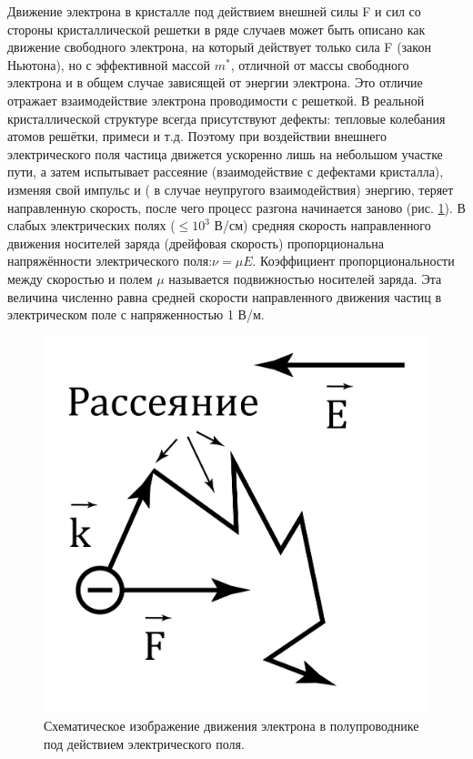 Движение электрона в кристалле под действием внешней силы F и сил со стороны кристаллической решетки в ряде случаев
может быть описано как движение свободного электрона, на который действует только сила F (закон Ньютона), но с
эффективной массой $m^*$, отличной от массы свободного электрона и в общем случае зависящей от энергии электрона. Это
отличие отражает взаимодействие электрона проводимости с решеткой. 
В реальной кристаллической структуре всегда присутствуют дефекты: тепловые колебания атомов решётки, примеси и т.д.
Поэтому при воздействии внешнего электрического поля частица движется ускоренно лишь на небольшом участке пути, а затем
испытывает рассеяние (взаимодействие с дефектами кристалла), изменяя свой импульс и ( в случае неупругого
взаимодействия) энергию, теряет направленную скорость, после чего процесс разгона начинается заново (рис. \ref{fig:3.1}). В слабых
электрических полях ($\leq 10^3$ В/см) средняя скорость направленного движения носителей заряда (дрейфовая скорость)
пропорциональна напряжённости электрического поля:$\nu = \mu E$. Коэффициент пропорциональности между скоростью и полем $\mu$
называется подвижностью носителей заряда. Эта величина численно равна средней скорости направленного движения частиц в
электрическом поле с напряженностью 1 В/м. 

\begin{figure}
	\centering
	\includegraphics[width = .9\linewidth]{img/31}
	\caption{Схематическое изображение движения электрона в полупроводнике под действием электрического поля.}
	\label{fig:3.1}
\end{figure}

